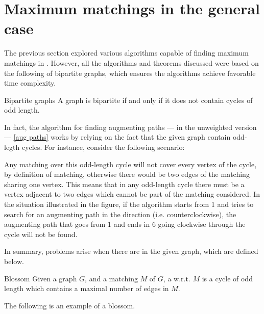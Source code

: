 \documentclass[a4paper, 12pt]{report}
\begin{document}
    \section{Maximum matchings in the general case}

    The previous section explored various algorithms capable of finding maximum matchings in . However, all the algorithms and theorems discussed were based on the following  of bipartite graphs, which ensures the algorithms achieve favorable time complexity.

    \begin{framedthm}{Bipartite graphs}
        A graph is bipartite if and only if it does not contain cycles of odd length.
    \end{framedthm}

    In fact, the algorithm for finding augmenting paths --- in the unweighted version --- \cref{aug paths} works by relying on the fact that the given graph  contain odd-legth cycles. For instance, consider the following scenario:


    Any matching over this odd-length cycle will not cover every vertex of the cycle, by definition of matching, otherwise there would be two edges of the matching sharing one vertex. This means that in any odd-length cycle there must be a vertex adjacent to two edges which cannot be part of the matching considered. In the situation illustrated in the figure, if the algorithm starts from 1 and tries to search for an augmenting path in the  direction (i.e. counterclockwise), the augmenting path that goes from 1 and ends in 6 going clockwise through the cycle will not be found.

    In summary, problems arise when there are  in the given graph, which are defined below.

    \begin{frameddefn}[label={blossom}]{Blossom}
        Given a graph $G$, and a matching $M$ of $G$, a  w.r.t. $M$ is a cycle of odd length which contains a maximal number of edges in $M$.
    \end{frameddefn}

    \begin{example}[Blossoms]
        The following is an example of a blossom.

    \end{example}
\end{document}
